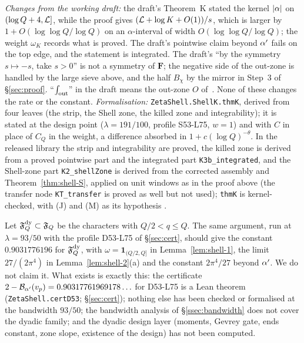 \emph{Changes from the working draft:} the draft's Theorem~K stated the kernel $\lvert \alpha\rvert$ on $(\log Q+4,\mathcal L]$, while the proof gives
$(\mathcal L+\log K+O(1))/s$, which is larger by $1+O(\log\log Q/\log Q)$ on an $\alpha$-interval of width $O(\log\log Q/\log Q)$; the weight $\omega_K$ records what is proved.
The draft's pointwise claim beyond $\alpha'$ fails on the top edge, and the statement is integrated. The draft's ``by the symmetry $s\mapsto-s$, take $s>0$'' is not a
symmetry of $\mathbf F$; the negative side of the out-zone is handled by the large sieve above, and the half $B_\chi$ by the mirror in Step~3 of \S\ref{sec:proof}. ``$\int_{\rm out}$'' in the draft means the out-zone $O$ of~\cite[Lemma~4.3]{DSouza}.
None of these changes the rate or the constant. \emph{Formalisation:} \texttt{ZetaShell.ShellK.thmK}, derived from four leaves (the strip, the Shell zone, the killed
zone and integrability); it is stated at the design point ($\lambda=191/100$, profile S53-L75, $w=1$) and with $C$ in place of $C_Q$ in the weight, a
difference absorbed in $1+c(\log Q)^{-\theta}$. In the released library the strip and integrability are proved, the killed zone is derived from a
proved pointwise part and the integrated part \texttt{K3b\_integrated}, and the Shell-zone part \texttt{K2\_shellZone} is derived from the corrected
assembly and Theorem~\ref{thm:shell-S}, applied on unit windows as in the proof above (the transfer node \texttt{KT\_transfer} is proved as well but
not used); \texttt{thmK} is kernel-checked, with (J) and (M) as its hypothesis \tagL.

\begin{remark}\label{rem:shell-dyadic}
Let $\mathfrak F_Q^{\rm dy}\subset\mathfrak F_Q$ be the characters with $Q/2<q\le Q$. The same argument, run at $\lambda=93/50$ with the profile D53-L75 of \S\ref{sec:cert}, should
give the constant $0.9031776196$ for $\mathfrak F_Q^{\rm dy}$, with $\omega=\mathbf 1_{(Q/2,Q]}$ in Lemma~\ref{lem:shell-1}, the limit $27/(2\pi^4)$ in
Lemma~\ref{lem:shell-2}(a) and the constant $2\pi^4/27$ beyond $\alpha'$. We do not claim it. What exists is exactly this: the certificate
$2-\mathcal B_{\alpha'}(v_p)=0.90317761969178\ldots$ for D53-L75 is a Lean theorem (\texttt{ZetaShell.certD53}; \S\ref{sec:cert}); nothing else has been
checked or formalised at the bandwidth $93/50$; the bandwidth analysis of \S\ref{ssec:bandwidth} does not cover the dyadic family; and the dyadic
design layer (moments, Gevrey gate, ends constant, zone slope, existence of the design) has not been computed.
\end{remark}
